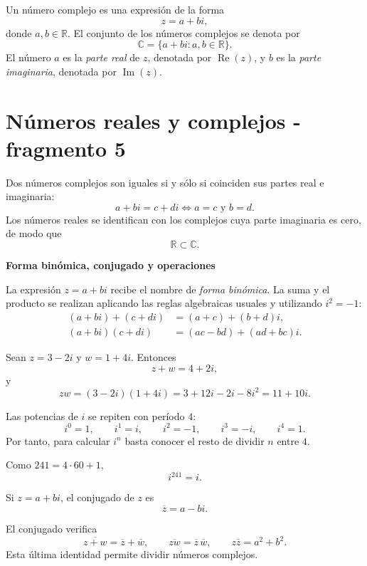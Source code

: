 \begin{definition}
Un número complejo es una expresión de la forma
\[
z=a+bi,
\]
donde \(a,b\in\mathbb{R}\). El conjunto de los números complejos se denota por
\[
\mathbb{C}=\{a+bi:a,b\in\mathbb{R}\}.
\]
El número \(a\) es la \emph{parte real} de \(z\), denotada por \(\operatorname{Re}(z)\), y \(b\) es la \emph{parte imaginaria}, denotada por \(\operatorname{Im}(z)\).
\end{definition}


\section{Números reales y complejos - fragmento 5}
Dos números complejos son iguales si y sólo si coinciden sus partes real e imaginaria:
\[
a+bi=c+di\Longleftrightarrow a=c\text{ y }b=d.
\]
Los números reales se identifican con los complejos cuya parte imaginaria es cero, de modo que
\[
\mathbb{R}\subset\mathbb{C}.
\]

\textbf{Forma binómica, conjugado y operaciones}

La expresión \(z=a+bi\) recibe el nombre de \emph{forma binómica}. La suma y el producto se realizan aplicando las reglas algebraicas usuales y utilizando \(i^2=-1\):
\begin{align*}
(a+bi)+(c+di)&=(a+c)+(b+d)i,\\
(a+bi)(c+di)&=(ac-bd)+(ad+bc)i.
\end{align*}

\begin{example}
Sean \(z=3-2i\) y \(w=1+4i\). Entonces
\[
z+w=4+2i,
\]
y
\[
zw=(3-2i)(1+4i)=3+12i-2i-8i^2=11+10i.
\]
\end{example}

Las potencias de \(i\) se repiten con período \(4\):
\[
i^0=1,\qquad i^1=i,\qquad i^2=-1,\qquad i^3=-i,\qquad i^4=1.
\]
Por tanto, para calcular \(i^n\) basta conocer el resto de dividir \(n\) entre \(4\).

\begin{example}
Como \(241=4\cdot60+1\),
\[
i^{241}=i.
\]
\end{example}

\begin{definition}[Conjugado]
Si \(z=a+bi\), el conjugado de \(z\) es
\[
\overline{z}=a-bi.
\]
\end{definition}

El conjugado verifica
\[
\overline{z+w}=\overline z+\overline w,
\qquad
\overline{zw}=\overline z\,\overline w,
\qquad
z\overline z=a^2+b^2.
\]
Esta última identidad permite dividir números complejos.

